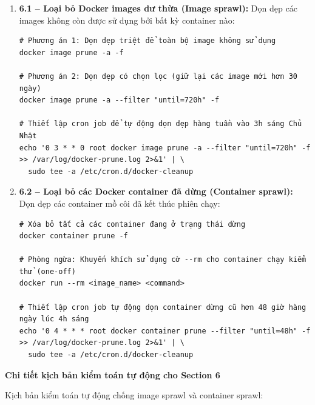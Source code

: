 \begin{enumerate}
    \item \textbf{6.1 -- Loại bỏ Docker images dư thừa (Image sprawl):}
    Dọn dẹp các images không còn được sử dụng bởi bất kỳ container nào:
{\footnotesize
\begin{verbatim}
# Phương án 1: Dọn dẹp triệt để toàn bộ image không sử dụng
docker image prune -a -f

# Phương án 2: Dọn dẹp có chọn lọc (giữ lại các image mới hơn 30 ngày)
docker image prune -a --filter "until=720h" -f

# Thiết lập cron job để tự động dọn dẹp hàng tuần vào 3h sáng Chủ Nhật
echo '0 3 * * 0 root docker image prune -a --filter "until=720h" -f >> /var/log/docker-prune.log 2>&1' | \
  sudo tee -a /etc/cron.d/docker-cleanup
\end{verbatim}
}

    \item \textbf{6.2 -- Loại bỏ các Docker container đã dừng (Container sprawl):}
    Dọn dẹp các container mồ côi đã kết thúc phiên chạy:
{\footnotesize
\begin{verbatim}
# Xóa bỏ tất cả các container đang ở trạng thái dừng
docker container prune -f

# Phòng ngừa: Khuyến khích sử dụng cờ --rm cho container chạy kiểm thử (one-off)
docker run --rm <image_name> <command>

# Thiết lập cron job tự động dọn container dừng cũ hơn 48 giờ hàng ngày lúc 4h sáng
echo '0 4 * * * root docker container prune --filter "until=48h" -f >> /var/log/docker-prune.log 2>&1' | \
  sudo tee -a /etc/cron.d/docker-cleanup
\end{verbatim}
}
\end{enumerate}

\noindent\textbf{Chi tiết kịch bản kiểm toán tự động cho Section 6}

Kịch bản kiểm toán tự động chống image sprawl và container sprawl:

